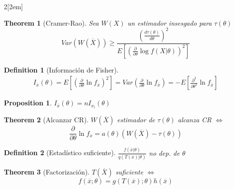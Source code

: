 \documentclass[leqno]{article}
\newtheorem*{theorem}{Theorem}
\newtheorem*{proposition}{Proposition}
\newtheorem*{definition}{Definition}
\begin{document}
\begin{multicols}{2}[\columnsep2em]
\begin{theorem}[Cramer-Rao] Sea $W(X)$ un estimador insesgado para $\tau (\theta )$
  \[
	Var(W(\overline{X}))\ge \frac{\left(\frac{d \tau (\theta )}{d \theta } \right)^2}{E\left[ \left( \frac{\partial}{\partial\theta } \log f(X|\theta ) \right)^2 \right]}
  \] 
\end{theorem}

\begin{definition}[Información de Fisher]
  \begin{align*}
  I_{\overline{x}}(\theta ) = E\left[ \left(  \frac{\partial}{\partial \theta } \ln f_{\overline{x}} \right) ^2 \right]  = Var\left(\frac{\partial}{\partial \theta }\ln f_{\overline{x}}\right) =  -E\left[  \frac{\partial^2}{\partial \theta ^2} \ln f_{\overline{x}} \right]
  \end{align*}
\end{definition}

\begin{proposition} $I_{\overline{x}}(\theta ) = nI_{x_i}(\theta )$
\end{proposition}

\begin{theorem}[Alcanzar CR] $W(\overline{X})$ estimador de $\tau (\theta )$ alcanza CR  $\iff$
\[
\frac{\partial}{\partial \theta } \ln f_{\overline{x}} = a(\theta )(W(\overline{X})-\tau (\theta ))
\] 
\end{theorem}

\begin{definition}[Estadístico suficiente] $\frac{f(\overline{x}|\theta )}{q(T(\overline{x})|\theta )}$ no dep. de $\theta $
\end{definition}

\begin{theorem}[Factorización] $T(\overline{X})$ suficiente $\iff$ 
\[
f(\overline{x}; \theta ) = g(T(\overline{x});\theta )h(\overline{x})
\] 
\end{theorem}

\end{multicols}
\end{document}
